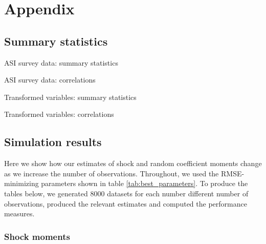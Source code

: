 
\section{Appendix}

\subsection{Summary statistics} \label{sec:summary_statistics}



\begin{table}[H]
  \singlespacing
  \caption{ASI survey data: summary statistics}
  
  \label{tab:summary_statistics_raw1}
\end{table}

\begin{table}[H]
  \singlespacing
  \caption{ASI survey data: correlations}
  
  \label{tab:summary_statistics_raw2}
\end{table}


\begin{table}[H]
  \singlespacing
  \caption{Transformed variables: summary statistics}
  
  \label{tab:summary_statistics_processed1}
\end{table}

\begin{table}[H]
  \singlespacing
  \caption{Transformed variables: correlations}
  
  \label{tab:summary_statistics_processed2}
\end{table}


\subsection{Simulation results}

Here we show how our estimates of shock and random coefficient moments change as we increase the number of observations. Throughout, we used the RMSE-minimizing parameters shown in table \ref{tab:best_parameters}. To produce the tables below, we generated 8000 datasets for each number different number of observations, produced the relevant estimates and computed the performance measures.

\subsubsection*{Shock moments}

